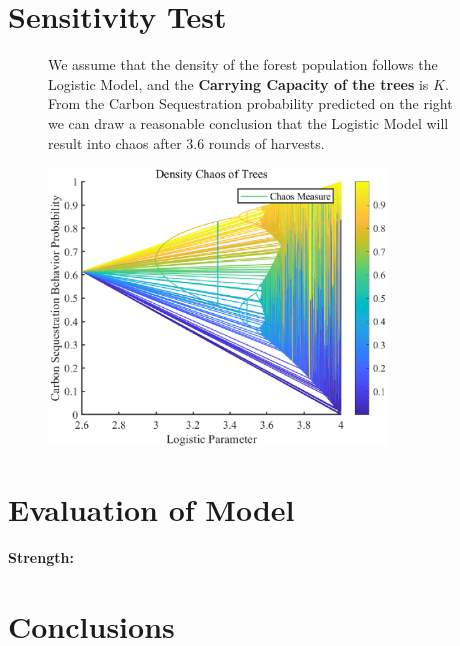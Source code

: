 \documentclass{mcmthesis}
\numberwithin{figure}{section}
\numberwithin{table}{section}
\numberwithin{equation}{section}
\begin{document}
\section{Sensitivity Test}
\begin{figure}[ht]
  \begin{minipage}[htbp]{0.4\linewidth}
    We assume that the density of the forest population follows the Logistic Model,
    and the \textbf{Carrying Capacity of the trees} is $ K $. From the Carbon Sequestration
    probability predicted on the right we can draw a reasonable conclusion that
    the Logistic Model will result into chaos after 3.6 rounds of harvests. 

  \end{minipage}
  \hfill
  \begin{minipage}[htbp]{0.55\linewidth}
    \begin{flushright}
      \includegraphics[width = 9cm]{code&pic/Logistic.eps}
    \end{flushright}
  \end{minipage}
\end{figure}
\section{Evaluation of Model}

\textbf{Strength:}


\section{Conclusions}



\newpage
{}
\memodate{\today}
\end{document}
